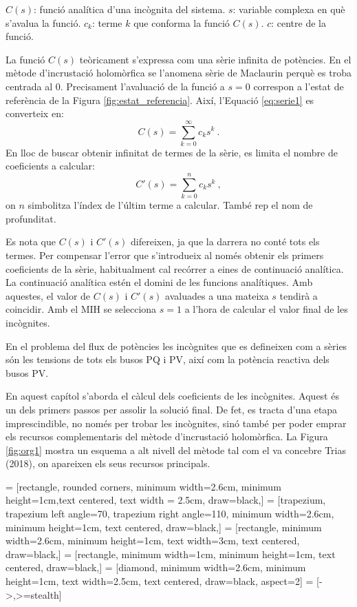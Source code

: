 $C(s)$: funció analítica d'una incògnita del sistema.
\vs
$s$: variable complexa en què s'avalua la funció. 
\vs
$c_k$: terme $k$ que conforma la funció  $C(s)$.
\vs
$c$: centre de la funció.

La funció $C(s)$ teòricament s'expressa com una sèrie infinita de potències. En el mètode d'incrustació holomòrfica se l'anomena sèrie de Maclaurin perquè es troba centrada al 0. Precisament l'avaluació de la funció a $s=0$ correspon a l'estat de referència de la Figura \ref{fig:estat_referencia}. Així, l'Equació \ref{eq:serie1} es converteix en: 
\begin{equation}
    C(s)=\sum_{k=0}^{\infty}c_ks^{k}\ .
    \label{eq:serie2}
\end{equation}
En lloc de buscar obtenir infinitat de termes de la sèrie, es limita el nombre de coeficients a calcular:
\begin{equation}
    C'(s)=\sum_{k=0}^{n}c_ks^{k}\ ,
    \label{eq:serie3}
\end{equation}
on $n$ simbolitza l'índex de l'últim terme a calcular. També rep el nom de profunditat.

Es nota que $C(s)$ i $C'(s)$ difereixen, ja que la darrera no conté tots els termes. Per compensar l'error que s'introdueix al només obtenir els primers coeficients de la sèrie, habitualment cal recórrer a eines de continuació analítica. La continuació analítica estén el domini de les funcions analítiques. Amb aquestes, el valor de $C(s)$ i $C'(s)$ avaluades a una mateixa $s$ tendirà a coincidir. Amb el MIH se selecciona $s=1$ a l'hora de calcular el valor final de les incògnites.

En el problema del flux de potències les incògnites que es defineixen com a sèries són les tensions de tots els busos PQ i PV, així com la potència reactiva dels busos PV. 

En aquest capítol s'aborda el càlcul dels coeficients de les incògnites. Aquest és un dels primers passos per assolir la solució final. De fet, es tracta d'una etapa imprescindible, no només per trobar les incògnites, sinó també per poder emprar els recursos complementaris del mètode d'incrustació holomòrfica. La Figura \ref{fig:org1} mostra un esquema a alt nivell del mètode tal com el va concebre Trias (2018), on apareixen els seus recursos principals.

 = [rectangle, rounded corners, minimum width=2.6cm, minimum height=1cm,text centered, text width = 2.5cm, draw=black,]
 = [trapezium, trapezium left angle=70, trapezium right angle=110, minimum width=2.6cm, minimum height=1cm, text centered, draw=black,]
 = [rectangle, minimum width=2.6cm, minimum height=1cm, text width=3cm, text centered, draw=black,]
 = [rectangle, minimum width=1cm, minimum height=1cm, text centered, draw=black,]
 = [diamond, minimum width=2.6cm, minimum height=1cm, text width=2.5cm, text centered, draw=black, aspect=2]
 = [->,>=stealth]


